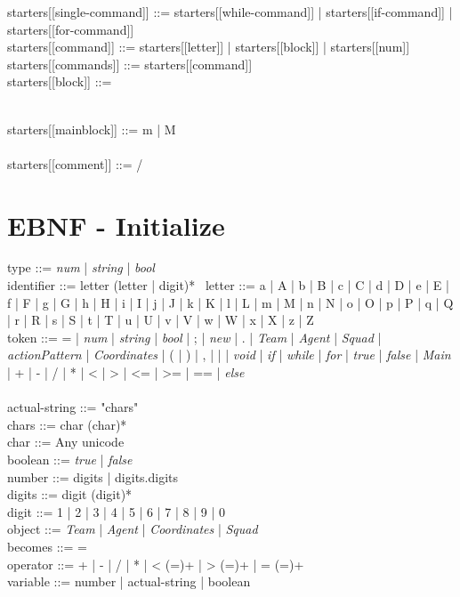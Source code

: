 starters[[single-command]] ::= starters[[while-command]] | starters[[if-command]] | starters[[for-command]] \\
starters[[command]] ::= starters[[letter]] | starters[[block]] | starters[[num]] \\
starters[[commands]] ::= starters[[command]] \\
starters[[block]] ::= { \\
starters[[mainblock]] ::= m | M \\
\\
starters[[comment]] ::= /


\section{EBNF - Initialize}
\label{ap:ebnf}

type ::= \textit{num} | \textit{string} | \textit{bool} \\
identifier ::= letter (letter | digit)* \
letter ::= a | A | b | B | c | C | d | D | e | E | f | F | g | G | h | H | i | I | j | J | k | K | l | L | m | M | n | N | o | O | p | P | q | Q | r | R | s | S | t | T | u | U | v | V | w | W | x | X | z | Z \\
token ::= = | \textit{num} | \textit{string} | \textit{bool} | ; | \textit{new} | . | \textit{Team} | \textit{Agent} | \textit{Squad} | \textit{actionPattern} | \textit{Coordinates}  | ( | ) | , | { | } | \textit{void} | \textit{if} | \textit{while} | \textit{for} | \textit{true} | \textit{false} | \textit{Main} | + | - | / | * | < | > | <= | >= | == | \textit{else} \\
\\
actual-string ::= "chars" \\
chars ::= char (char)* \\
char ::= Any unicode \\
boolean ::= \textit{true} | \textit{false} \\
number ::= digits | digits.digits \\
digits ::= digit (digit)* \\
digit ::= 1 | 2 | 3 | 4 | 5 | 6 | 7 | 8 | 9 | 0 \\
object ::= \textit{Team} | \textit{Agent} | \textit{Coordinates} | \textit{Squad} \\
becomes ::= = \\
operator ::= + | - | / | * | < (=)+ | > (=)+ | = (=)+ \\
variable ::= number | actual-string | boolean \\
\\
}

